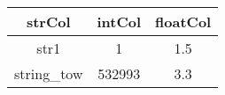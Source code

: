 \begin{tabular}{|c|c|c|}
	\hline
	strCol & intCol & floatCol \\
	\hline
	str1 & 1 & 1.5 \\
	\hline
	string\_tow & 532993 & 3.3 \\
	\hline
\end{tabular}